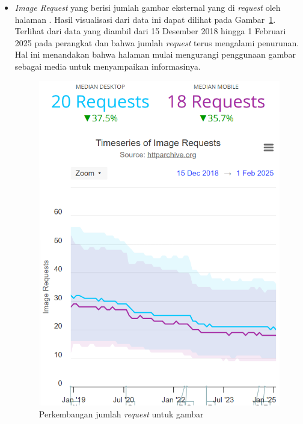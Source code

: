 \begin{itemize}
    \item \textit{Image Request} yang berisi jumlah gambar eksternal yang di \textit{request} oleh halaman \web. Hasil visualisasi dari data ini dapat dilihat pada Gambar~\ref{fig:imagerequest}. Terlihat dari data yang diambil dari 15 Desember 2018 hingga 1 Februari 2025 pada perangkat \desktop dan \mobile bahwa jumlah \textit{request} terus mengalami penurunan. Hal ini menandakan bahwa halaman \web mulai mengurangi penggunaan gambar sebagai media untuk menyampaikan informasinya.
    \begin{figure}[H]
        \centering
        \includegraphics[width=0.4\linewidth]{Gambar/Contoh Image Request.png}
        \caption{Perkembangan jumlah \textit{request} untuk gambar}
        \label{fig:imagerequest}
    \end{figure}


\end{itemize}
